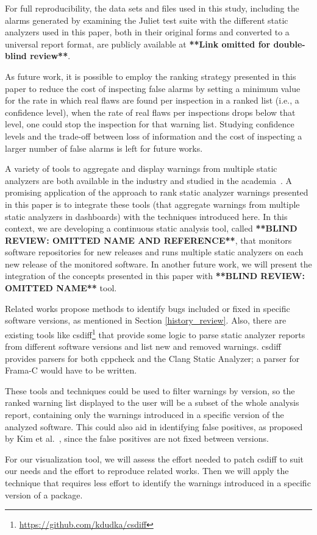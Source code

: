 For full reproducibility, the data sets and files used in this study,
including the alarms generated by examining the Juliet test suite with the
different static analyzers used in this paper, both in their original forms and
converted to a universal report format, are publicly available at
\textbf{**Link omitted for double-blind review**}.

As future work, it is possible to employ the ranking strategy presented in this
paper to reduce the cost of inspecting false alarms by setting a minimum value
for the rate in which real flaws are found per inspection in a ranked list
(i.e., a confidence level), when the rate of real flaws per inspections drops
below that level, one could stop the inspection for that warning list. Studying
confidence levels and the trade-off between loss of information and the cost of
inspecting a larger number of false alarms is left for future works.

A variety of tools to aggregate and display warnings from multiple static
analyzers are both available in the industry and studied in the
academia~\cite{buckers2017uav, heinemann2014teamscale}. A promising application
of the approach to rank static analyzer warnings presented in this paper is to
integrate these tools (that aggregate warnings from multiple static analyzers
in dashboards) with the techniques introduced here. In this context, we are
developing a continuous static analysis tool, called \textbf{**BLIND REVIEW:
OMITTED NAME AND REFERENCE**}, that monitors software repositories for new
releases and runs multiple static analyzers on each new release of the
monitored software.  In another future work, we will present the integration of
the concepts presented in this paper with \textbf{**BLIND REVIEW: OMITTED
NAME**} tool.


Related works propose methods to identify bugs included or fixed in specific
software versions, as mentioned in Section \ref{history_review}.
Also, there are existing tools like
csdiff\footnote{\url{https://github.com/kdudka/csdiff}} that provide some
logic to parse static analyzer reports from different software versions and
list new and removed warnings. csdiff provides parsers for both cppcheck and
the Clang Static Analyzer; a parser for Frama-C would have to be written.

These tools and techniques could be used to filter warnings by version, so the
ranked warning list displayed to the user will be a subset of the whole
analysis report, containing only the warnings introduced in a specific version
of the analyzed software. This could also aid in identifying false positives,
as proposed by Kim et al.~\cite{kim_which_2007}, since the false positives are
not fixed between versions.

For our visualization tool, we will assess the effort needed to patch csdiff
to suit our needs and the effort to reproduce related works. Then we will
apply the technique that requires less effort to identify the warnings introduced
in a specific version of a package.
